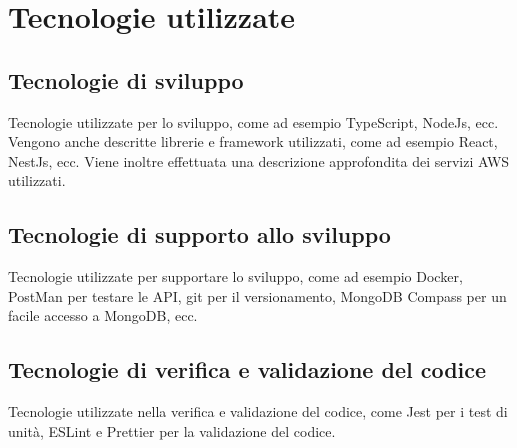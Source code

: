 \section{Tecnologie utilizzate}
\label{sez:tecnologie-utilizzate}

\subsection{Tecnologie di sviluppo}
\label{sez:tecnologie-sviluppo}

Tecnologie utilizzate per lo sviluppo, come ad esempio TypeScript, NodeJs, ecc.
Vengono anche descritte librerie e framework utilizzati, come ad esempio React, NestJs, ecc.
Viene inoltre effettuata una descrizione approfondita dei servizi AWS utilizzati.

\subsection{Tecnologie di supporto allo sviluppo}
\label{sez:tecnologie-supporto-sviluppo}

Tecnologie utilizzate per supportare lo sviluppo, come ad esempio Docker, PostMan per testare le API, git per il versionamento, MongoDB Compass per un facile accesso a MongoDB, ecc.

\subsection{Tecnologie di verifica e validazione del codice}
\label{sez:tecnologie-validazione-codice}

Tecnologie utilizzate nella verifica e validazione del codice, come Jest per i test di unità, ESLint e Prettier per la validazione del codice. 